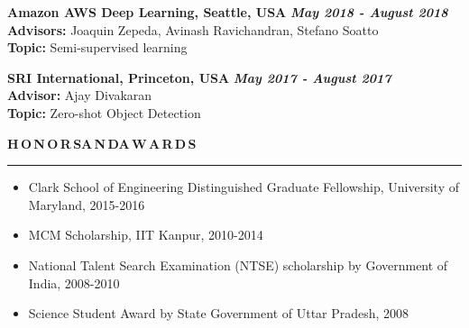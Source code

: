 \documentclass[11pt, a4paper]{article}
\begin{document}
\textbf{Amazon AWS Deep Learning, Seattle, USA} \hfill \textit{\textbf{May 2018 - August 2018}} \\
\textbf{Advisors: }Joaquin Zepeda, Avinash Ravichandran, Stefano Soatto \\
\textbf{Topic: }Semi-supervised learning

\vspace{4pt}

\textbf{SRI International, Princeton, USA} \hfill \textit{\textbf{May 2017 - August 2017}} \\
\textbf{Advisor: }Ajay Divakaran \\
\textbf{Topic: }Zero-shot Object Detection

%

%
	
\vspace{8pt}

\textbf{H\,O\,N\,O\,R\,S{\hspace{0.6em}}A\,N\,D{\hspace{0.6em}}A\,W\,A\,R\,D\,S}
\vspace{5pt}
\hrule
\vspace{-3pt}
\begin{itemize}[leftmargin=*] \itemsep1pt \parskip0pt 
\item Clark School of Engineering Distinguished Graduate Fellowship, University of Maryland, 2015-2016
\item MCM Scholarship, IIT Kanpur, 2010-2014
\item National Talent Search Examination (NTSE) scholarship by Government of India, 2008-2010
\item Science Student Award by State Government of Uttar Pradesh, 2008
\end{itemize}
\end{document}
